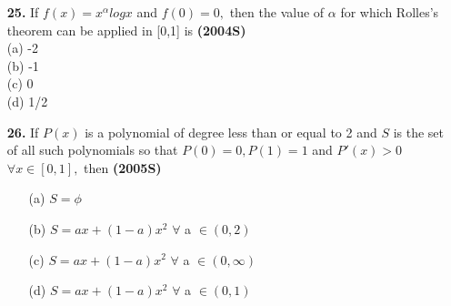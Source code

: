 \documentclass[journal,12pt,twocolumn]{IEEEtran}
\theoremstyle{remark}
\begin{document}
 \begin{enumerate}
    \item[\textbf{25.}] If $f(x)=x^{\alpha} logx$ and $f(0)=0,$ then the value of $\alpha$ for which Rolles's theorem can be applied in [0,1] is 
    \hfill{\textbf{(2004S)}} \\
    
    (a) -2 \\
    (b) -1 \\(c) 0 \\ (d) 1/2 \\
    
    \item[\textbf{26.}] If $P(x)$ is a polynomial of degree less than or equal to 2 and $S$ is the set of all such polynomials so that $P(0)=0,P(1)=1$ and $P'(x)>0$ $\forall x \in [0,1],$ then
    \hfill{\textbf{(2005S)}} 
    \begin{enumerate}
        \item [(a)] $S=\phi$
        \item [(b)] $S=ax+(1-a)x^2$ $\forall$ a $\in (0,2)$
        \item [(c)] $S=ax+(1-a)x^2$ $\forall$ a $\in (0,\infty)$
        \item [(d)] $S=ax+(1-a)x^2$ $\forall$ a $\in (0,1)$ \\
    \end{enumerate} 
   \end{enumerate} 
   
\end{document}
